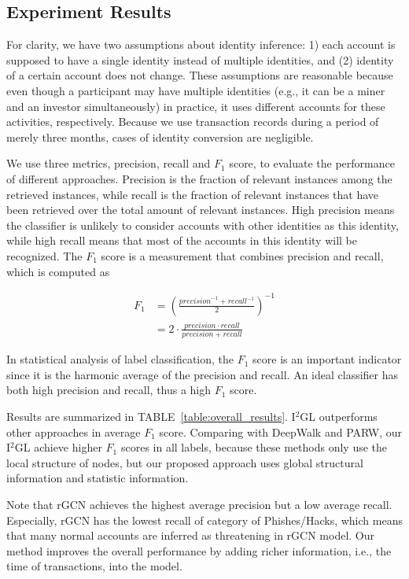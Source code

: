 \subsection{Experiment Results}
For clarity, we have two assumptions about identity inference: 1) each account is supposed to have a single identity instead of multiple identities, and (2) identity of a certain account does not change. These assumptions are reasonable because even though a participant may have multiple identities (e.g., it can be a miner and an investor simultaneously) in practice, it uses different accounts for these activities, respectively. Because we use transaction records during a period of merely three months, cases of identity conversion are negligible.

We use three metrics, precision, recall and $F_1$ score, to evaluate the performance of different approaches. Precision is the fraction of relevant instances among the retrieved instances, while recall is the fraction of relevant instances that have been retrieved over the total amount of relevant instances. High precision means the classifier is unlikely to consider accounts with other identities as this identity, while high recall means that most of the accounts in this identity will be recognized. The $F_1$ score is a measurement that combines precision and recall, which is computed as

\begin{equation}
\begin{split}
F_1&=(\frac{{precision}^{-1}+{recall}^{-1}}{2})^{-1}\\
&=2\cdot\frac{precision \cdot recall}{precision + recall}
\end{split}
\end{equation}

In statistical analysis of label classification, the $F_1$ score is an important indicator since it is the harmonic average of the precision and recall. An ideal classifier has both high precision and recall, thus a high $F_1$ score.

Results are summarized in TABLE~\ref{table:overall_results}. I$^2$GL outperforms other approaches in average $F_1$ score. Comparing with DeepWalk and PARW, our I$^2$GL achieve higher $F_1$ scores in all labels, because these methods only use the local structure of nodes, but our proposed approach uses global structural information and statistic information.

Note that rGCN achieves the highest average precision but a low average recall. Especially, rGCN has the lowest recall of category of Phishes/Hacks, which means that many normal accounts are inferred as threatening in rGCN model. Our method improves the overall performance by adding richer information, i.e., the time of transactions, into the model.

